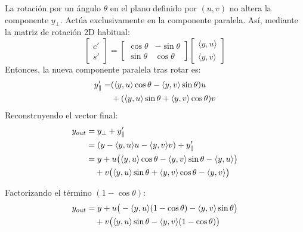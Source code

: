 La rotación por un ángulo $\theta$ en el plano definido por $(u, v)$ no altera la componente $y_\perp$. Actúa exclusivamente en la componente paralela. Así, mediante la matriz de rotación 2D habitual:
\begin{equation}
    \begin{bmatrix} c' \\ s' \end{bmatrix} = 
    \begin{bmatrix} \cos\theta & -\sin\theta \\ \sin\theta & \cos\theta \end{bmatrix}
    \begin{bmatrix} \langle y, u \rangle \\ \langle y, v \rangle \end{bmatrix}
\end{equation}
Entonces, la nueva componente paralela tras rotar es:
\begin{align}
    y'_{\parallel} = & (\langle y, u \rangle \cos\theta - \langle y, v \rangle \sin\theta) u \notag \\
                     & + (\langle y, u \rangle \sin\theta + \langle y, v \rangle \cos\theta) v
\end{align}
Reconstruyendo el vector final:
\begin{align}
    y_{out} &= y_\perp + y'_{\parallel} \notag \\
            &= (y - \langle y, u \rangle u - \langle y, v \rangle v) + y'_{\parallel} \notag \\
            &= y + u \big( \langle y, u \rangle \cos\theta - \langle y, v \rangle \sin\theta - \langle y, u \rangle \big) \notag \\
            &\quad + v \big( \langle y, u \rangle \sin\theta + \langle y, v \rangle \cos\theta - \langle y, v \rangle \big)
\end{align}

Factorizando el término $(1 - \cos\theta)$:
\begin{align}
    y_{out} &= y + u \big( - \langle y, u \rangle(1 - \cos\theta) - \langle y, v \rangle \sin\theta \big) \notag \\
            &\quad + v \big( \langle y, u \rangle \sin\theta - \langle y, v \rangle(1 - \cos\theta) \big)
\end{align}

